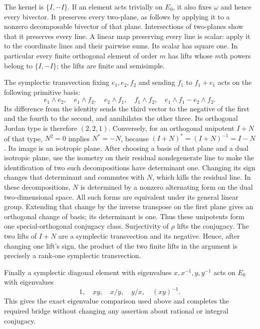 \documentclass[11pt,a4paper]{article}
\theoremstyle{definition}
\begin{document}
The kernel is $\{I,-I\}$. If an element acts trivially on
$E_0$, it also fixes $\omega$ and hence every bivector.
It preserves every two-plane, as follows by applying it to a
nonzero decomposable bivector of that plane. Intersections of
two-planes show that it preserves every line. A linear map
preserving every line is scalar: apply it to the coordinate lines
and their pairwise sums. Its scalar has square one. In particular
every finite orthogonal element of order $m$ has lifts whose
$m$th powers belong to $\{I,-I\}$; the lifts are finite and
semisimple.

The symplectic transvection fixing $e_1,e_2,f_2$ and sending
$f_1$ to $f_1+e_1$ acts on the following primitive basis:
\[
 e_1\wedge e_2,\quad e_1\wedge f_2,\quad
 e_2\wedge f_1,\quad f_1\wedge f_2,\quad
 e_1\wedge f_1-e_2\wedge f_2.
\]
Its difference from the identity sends the third vector to
the negative of the first and the fourth to the second, and
annihilates the other three. Its orthogonal Jordan type is
therefore $(2,2,1)$. Conversely, for an orthogonal unipotent
$I+N$ of that type, $N^2=0$ implies $N^*=-N$, because
$(I+N)^*=(I+N)^{-1}=I-N$. Its image is an isotropic plane.
After choosing a basis of that plane and a dual isotropic
plane, use the isometry on their residual nondegenerate line
to make the identification of two such decompositions have
determinant one. Changing its sign changes that determinant
and commutes with $N$, which kills the residual line.
In these decompositions, $N$ is determined by a nonzero alternating form on
the dual two-dimensional space. All such forms are equivalent
under its general linear group. Extending that change by the
inverse transpose on the first plane gives an orthogonal
change of basis; its determinant is one. Thus these unipotents
form one special-orthogonal conjugacy class. Surjectivity of
$\rho$ lifts the conjugacy. The two lifts of $I+N$ are a
symplectic transvection and its negative. Hence, after changing
one lift's sign, the product of the two finite lifts in the
argument is precisely a rank-one symplectic transvection.

Finally a symplectic diagonal element with eigenvalues
$x,x^{-1},y,y^{-1}$ acts on $E_0$ with eigenvalues
\[
 1,\quad xy,\quad x/y,\quad y/x,\quad (xy)^{-1}.
\]
This gives the exact eigenvalue comparison used above and
completes the required bridge without changing any assertion
about rational or integral conjugacy.
\end{document}
